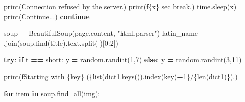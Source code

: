 \documentclass[
]{article}
\newenvironment{Shaded}{\begin{snugshade}}{\end{snugshade}}
\newcommand{\BuiltInTok}[1]{#1}
\newcommand{\ControlFlowTok}[1]{\textcolor[rgb]{0.13,0.29,0.53}{\textbf{#1}}}
\newcommand{\DecValTok}[1]{\textcolor[rgb]{0.00,0.00,0.81}{#1}}
\newcommand{\KeywordTok}[1]{\textcolor[rgb]{0.13,0.29,0.53}{\textbf{#1}}}
\newcommand{\NormalTok}[1]{#1}
\newcommand{\OperatorTok}[1]{\textcolor[rgb]{0.81,0.36,0.00}{\textbf{#1}}}
\newcommand{\SpecialCharTok}[1]{\textcolor[rgb]{0.00,0.00,0.00}{#1}}
\newcommand{\SpecialStringTok}[1]{\textcolor[rgb]{0.31,0.60,0.02}{#1}}
\newcommand{\StringTok}[1]{\textcolor[rgb]{0.31,0.60,0.02}{#1}}
\begin{document}
\begin{Shaded}
\begin{Highlighting}[]
                        \BuiltInTok{print}\NormalTok{(}\StringTok{\textquotesingle{}Connection refused by the server.\textquotesingle{}}\NormalTok{)}
                        \BuiltInTok{print}\NormalTok{(}\SpecialStringTok{f\textquotesingle{}}\SpecialCharTok{\{}\NormalTok{x}\SpecialCharTok{\}}\SpecialStringTok{ sec break.\textquotesingle{}}\NormalTok{)}
\NormalTok{                        time.sleep(x)}
                        \BuiltInTok{print}\NormalTok{(}\StringTok{\textquotesingle{}Continue...\textquotesingle{}}\NormalTok{)}
                        \ControlFlowTok{continue}

\NormalTok{                soup }\OperatorTok{=}\NormalTok{ BeautifulSoup(page.content, }\StringTok{"html.parser"}\NormalTok{)}
\NormalTok{                latin\_name }\OperatorTok{=} \StringTok{\textquotesingle{} \textquotesingle{}}\NormalTok{.join(soup.find(}\StringTok{\textquotesingle{}title\textquotesingle{}}\NormalTok{).text.split(}\StringTok{\textquotesingle{} \textquotesingle{}}\NormalTok{)[}\DecValTok{0}\NormalTok{:}\DecValTok{2}\NormalTok{])}

                \ControlFlowTok{try}\NormalTok{:}
                    \ControlFlowTok{if}\NormalTok{ t }\OperatorTok{==} \StringTok{\textquotesingle{}short\textquotesingle{}}\NormalTok{:}
\NormalTok{                        y }\OperatorTok{=}\NormalTok{ random.randint(}\DecValTok{1}\NormalTok{,}\DecValTok{7}\NormalTok{)}
                    \ControlFlowTok{else}\NormalTok{:}
\NormalTok{                        y }\OperatorTok{=}\NormalTok{ random.randint(}\DecValTok{3}\NormalTok{,}\DecValTok{11}\NormalTok{)}

                    \BuiltInTok{print}\NormalTok{(}\SpecialStringTok{f\textquotesingle{}Starting with }\SpecialCharTok{\{}\NormalTok{key}\SpecialCharTok{\}}\SpecialStringTok{ (}\SpecialCharTok{\{}\BuiltInTok{list}\NormalTok{(dict1.keys())}\SpecialCharTok{.}\NormalTok{index(key)}\OperatorTok{+}\DecValTok{1}\SpecialCharTok{\}}\SpecialStringTok{/}\SpecialCharTok{\{}\BuiltInTok{len}\NormalTok{(dict1)}\SpecialCharTok{\}}\SpecialStringTok{).\textquotesingle{}}\NormalTok{)}

                    \ControlFlowTok{for}\NormalTok{ item }\KeywordTok{in}\NormalTok{ soup.find\_all(}\StringTok{\textquotesingle{}img\textquotesingle{}}\NormalTok{):}


\end{Highlighting}
\end{Shaded}
\end{document}
